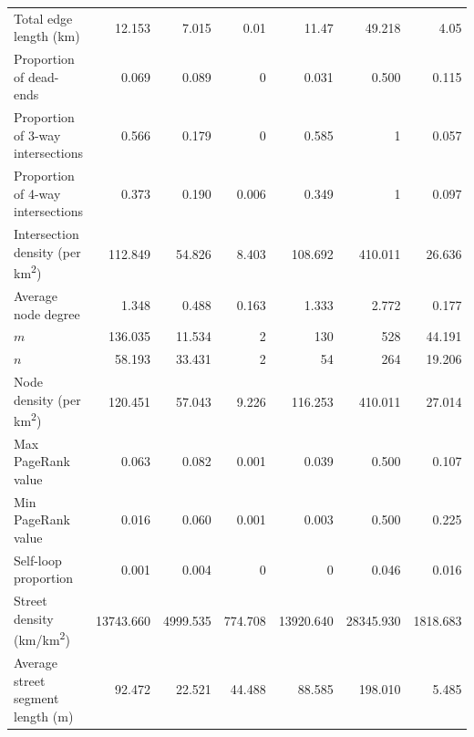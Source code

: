 \begin{landscape}
\begin{table}[htbp]
\begin{tabular}{ l r r r r r r }
    Total edge length (km)                           & 12.153           & 7.015          & 0.01            & 11.47           & 49.218         & 4.05      \\
    Proportion of dead-ends                          & 0.069          & 0.089          & 0          & 0.031          & 0.500          & 0.115          \\
    Proportion of 3-way intersections                & 0.566          & 0.179          & 0          & 0.585          & 1          & 0.057          \\
    Proportion of 4-way intersections                & 0.373          & 0.190          & 0.006          & 0.349          & 1          & 0.097          \\
    Intersection density (per km\textsuperscript{2}) & 112.849         & 54.826          & 8.403         & 108.692         & 410.011         & 26.636          \\
    Average node degree                              & 1.348          & 0.488          & 0.163          & 1.333          & 2.772          & 0.177          \\
    $m$                                              & 136.035          & 11.534          & 2           & 130          & 528         & 44.191     \\
    $n$                                              & 58.193          & 33.431          & 2            & 54           & 264         & 19.206      \\
    Node density (per km\textsuperscript{2})         & 120.451         & 57.043          & 9.226         & 116.253         & 410.011         & 27.014          \\
    Max PageRank value                               & 0.063          & 0.082          & 0.001 & 0.039          & 0.500          & 0.107 \\
    Min PageRank value                               & 0.016 & 0.060 & 0.001 & 0.003 & 0.500 & 0.225 \\
    Self-loop proportion                             & 0.001          & 0.004          & 0 & 0          & 0.046          & 0.016         \\
    Street density (km/km\textsuperscript{2})        & 13743.660          & 4999.535          & 774.708          & 13920.640          & 28345.930         & 1818.683          \\
    Average street segment length (m)                & 92.472        & 22.521         & 44.488        & 88.585        & 198.010        & 5.485          \\

\end{tabular}
\end{table}
\end{landscape}
